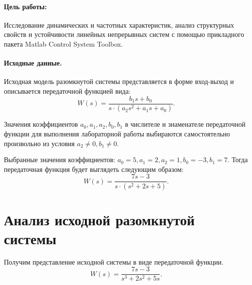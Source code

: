 \documentclass[12pt,a4paper]{article}
\begin{document}

\setcounter{page}{2}

\paragraph{Цель работы:}Исследование динамических и частотных характеристик, анализ структурных свойств и устойчивости линейных непрерывных систем с помощью прикладного пакета Matlab Control System Toolbox.
\paragraph{Исходные данные.}
Исходная модель разомкнутой системы представляется в форме вход-выход и
описывается передаточной функцией вида:
\begin{equation} 
W(s) = \frac{b_1s+b_0}{s\cdot(a_2s^2+a_1s+a_0)}.
\end{equation}

Значения коэффициентов $a_0, a_1, a_2, b_0, b_1$ в числителе и знаменателе передаточной функции для выполнения лабораторной работы выбираются самостоятельно произвольно из условия $a_2\neq0, b_1\neq0$.\par 
Выбранные значения коэффициентов: $a_0=5, a_1=2, a_2=1, b_0=-3, b_1=7$.
Тогда передаточная функция будет выглядеть следующим образом:
\begin{equation} 
W(s) = \frac{7s-3}{s\cdot(s^2+2s+5)}.
\end{equation}

\newpage
\section{Анализ исходной разомкнутой системы}
Получим представление исходной системы в виде передаточной функции.
\begin{equation} 
W(s) = \frac{7s-3}{s^3+2s^2+5s}.
\end{equation}
\end{document}
